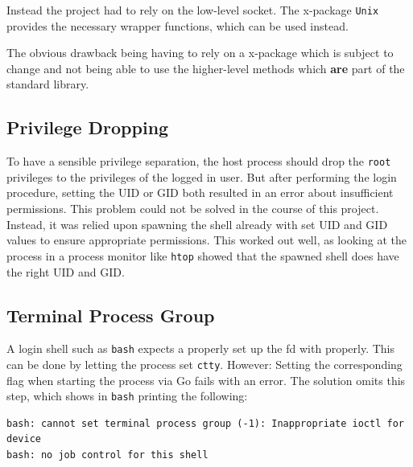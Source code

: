 \documentclass[10pt,a4paper,titlepage,twoside,english,final]{zhawreprt}
\begin{document}
Instead the project had to rely on the low-level \gls{socket}.
The \gls{x-package} \texttt{Unix} provides the necessary wrapper functions, which can be used instead.

The obvious drawback being having to rely on a \gls{x-package} which is subject to change and not being able to use the higher-level methods which \textbf{are} part of the standard library.

\subsection{Privilege Dropping}\label{ssec:PrivilegeDropping}
To have a sensible privilege separation, the host process should drop the \texttt{root} privileges to the privileges of the logged in user.
But after performing the \gls{login} procedure, setting the \gls{UID} or \gls{GID} both resulted in an error about insufficient permissions.
This problem could not be solved in the course of this project.
Instead, it was relied upon spawning the \gls{shell} already with set \gls{UID} and \gls{GID} values to ensure appropriate permissions.
This worked out well, as looking at the process in a process monitor like \texttt{htop} showed that the spawned \gls{shell} does have the right \gls{UID} and \gls{GID}.

\subsection{Terminal Process Group}\label{ssec:TerminalProcessGroup}
A \gls{login} \gls{shell} such as \texttt{bash} expects a properly set up the \gls{fd} with \cite{ioctl} properly.
This can be done by letting the process set \texttt{ctty}.
However: Setting the corresponding flag when starting the process via \gls{Go} fails with an error.
The solution omits this step, which shows in \texttt{bash} printing the following:

\setlistingBash
\begin{lstlisting}[caption={\texttt{bash} error when starting \gls{shell} without the \texttt{setctty} flag},label=lst:BashIoctlError]
bash: cannot set terminal process group (-1): Inappropriate ioctl for device
bash: no job control for this shell
\end{lstlisting}
\end{document}
